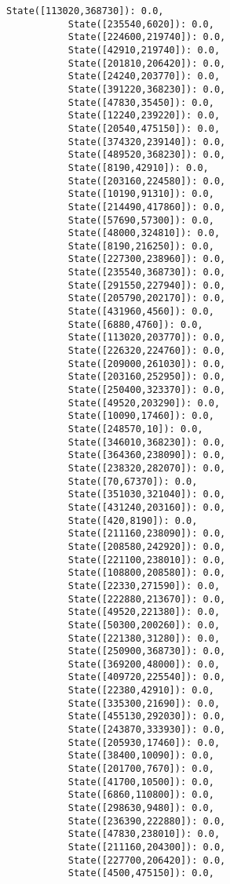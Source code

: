 \documentclass[11pt]{article}
\begin{document}
\begin{Verbatim}[commandchars=\\\{\}]
           State([113020,368730]): 0.0,
           State([235540,6020]): 0.0,
           State([224600,219740]): 0.0,
           State([42910,219740]): 0.0,
           State([201810,206420]): 0.0,
           State([24240,203770]): 0.0,
           State([391220,368230]): 0.0,
           State([47830,35450]): 0.0,
           State([12240,239220]): 0.0,
           State([20540,475150]): 0.0,
           State([374320,239140]): 0.0,
           State([489520,368230]): 0.0,
           State([8190,42910]): 0.0,
           State([203160,224580]): 0.0,
           State([10190,91310]): 0.0,
           State([214490,417860]): 0.0,
           State([57690,57300]): 0.0,
           State([48000,324810]): 0.0,
           State([8190,216250]): 0.0,
           State([227300,238960]): 0.0,
           State([235540,368730]): 0.0,
           State([291550,227940]): 0.0,
           State([205790,202170]): 0.0,
           State([431960,4560]): 0.0,
           State([6880,4760]): 0.0,
           State([113020,203770]): 0.0,
           State([226320,224760]): 0.0,
           State([209000,261030]): 0.0,
           State([203160,252950]): 0.0,
           State([250400,323370]): 0.0,
           State([49520,203290]): 0.0,
           State([10090,17460]): 0.0,
           State([248570,10]): 0.0,
           State([346010,368230]): 0.0,
           State([364360,238090]): 0.0,
           State([238320,282070]): 0.0,
           State([70,67370]): 0.0,
           State([351030,321040]): 0.0,
           State([431240,203160]): 0.0,
           State([420,8190]): 0.0,
           State([211160,238090]): 0.0,
           State([208580,242920]): 0.0,
           State([221100,238010]): 0.0,
           State([108800,208580]): 0.0,
           State([22330,271590]): 0.0,
           State([222880,213670]): 0.0,
           State([49520,221380]): 0.0,
           State([50300,200260]): 0.0,
           State([221380,31280]): 0.0,
           State([250900,368730]): 0.0,
           State([369200,48000]): 0.0,
           State([409720,225540]): 0.0,
           State([22380,42910]): 0.0,
           State([335300,21690]): 0.0,
           State([455130,292030]): 0.0,
           State([243870,333930]): 0.0,
           State([205930,17460]): 0.0,
           State([38400,10090]): 0.0,
           State([201700,7670]): 0.0,
           State([41700,10500]): 0.0,
           State([6860,110800]): 0.0,
           State([298630,9480]): 0.0,
           State([236390,222880]): 0.0,
           State([47830,238010]): 0.0,
           State([211160,204300]): 0.0,
           State([227700,206420]): 0.0,
           State([4500,475150]): 0.0,

\end{Verbatim}
\end{document}
